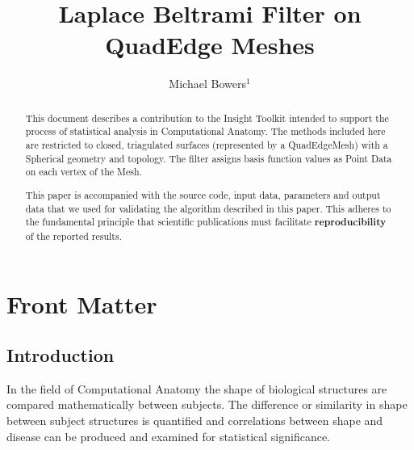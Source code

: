 \documentclass{InsightArticle}
\title{Laplace Beltrami Filter on QuadEdge Meshes}
\author{Michael Bowers$^{1}$}
\newcommand{\IJhandlerIDnumber}{3063}
\begin{document}
%
% 
\IJhandlefooter{\IJhandlerIDnumber}


\ifpdf
\else
\fi


\maketitle


\ifhtml
\chapter*{Front Matter\label{front}}
\fi


\begin{abstract}
\noindent
This document describes a contribution to the Insight Toolkit intended to
support the process of statistical analysis in Computational Anatomy.
The methods included here are
restricted to closed, triagulated surfaces (represented by a QuadEdgeMesh) 
with a Spherical geometry and
topology.  The filter assigns basis function values as Point Data on each 
vertex of the Mesh.

This paper is accompanied with the source code, input data, parameters and
output data that we used for validating the algorithm described in this paper.
This adheres to the fundamental principle that scientific publications must
facilitate \textbf{reproducibility} of the reported results.
\end{abstract}

\tableofcontents

\section{Introduction}

In the field of Computational Anatomy the shape of biological structures are
compared mathematically between subjects.  The difference or similarity in shape
between subject structures is quantified and correlations between shape and
disease can be produced and examined for statistical significance.
\end{document}
